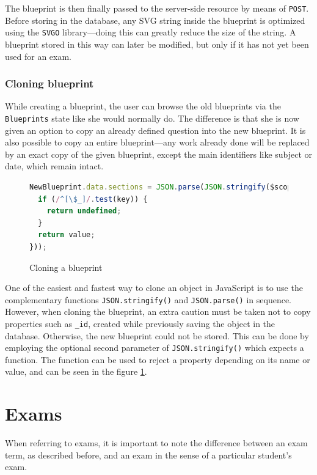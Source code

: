 \documentclass[thesis=M,english,hidelinks]{FITthesis}[2012/10/20]
\newcommand{\code}{\texttt}
\begin{document}
The blueprint is then finally passed to the server-side resource by means of \code{POST}. Before storing in the database, any SVG string inside the blueprint is optimized using the \code{SVGO} library---doing this can greatly reduce the size of the string. A blueprint stored in this way can later be modified, but only if it has not yet been used for an exam.

    \subsubsection{Cloning blueprint}

While creating a blueprint, the user can browse the old blueprints via the \code{Blueprints} state like she would normally do. The difference is that she is now given an option to copy an already defined question into the new blueprint. It is also possible to copy an entire blueprint---any work already done will be replaced by an exact copy of the given blueprint, except the main identifiers like subject or date, which remain intact.

\begin{figure}[h]
  \begin{lstlisting}[language=JavaScript]
NewBlueprint.data.sections = JSON.parse(JSON.stringify($scope.blueprint.sections, function stripJunk(key, value) {
  if (/^[\$_]/.test(key)) {
    return undefined;
  }
  return value;
}));
  \end{lstlisting}
  \caption{Cloning a blueprint}
  \label{fig:cloning_blueprint}
\end{figure}

One of the easiest and fastest way to clone an object in JavaScript is to use the complementary functions \code{JSON.stringify()} and \code{JSON.parse()} in sequence. However, when cloning the blueprint, an extra caution must be taken not to copy properties such as \code{\_id}, created while previously saving the object in the database. Otherwise, the new blueprint could not be stored. This can be done by employing the optional second parameter of \code{JSON.stringify()} which expects a function. The function can be used to reject a property depending on its name or value, and can be seen in the figure \ref{fig:cloning_blueprint}.

  \section{Exams}

When referring to exams, it is important to note the difference between an exam term, as described before, and an exam in the sense of a particular student's exam.
\end{document}
